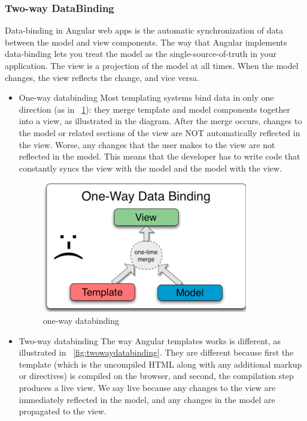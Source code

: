 \documentclass[14pt,a4paper]{extreport}
\begin{document}
			\subsubsection{Two-way DataBinding}
				Data-binding in Angular web apps is the automatic synchronization of data between the 
model and view components. The way that Angular implements data-binding lets you treat the model as the single-source-of-truth in your application. The view is a projection of the model at all times. When the model changes, the view reflects the change, and vice versa.
			\begin{itemize}
			\item One-way databinding
			Most templating systems bind data in only one direction (as in ~\ref{fig:onewaydatabinding}): they merge template and model components together into a view, as illustrated in the diagram. After the merge occurs, changes to the model or related sections of the view are NOT automatically reflected in the view. Worse, any changes that the user makes to the view are not reflected in the model. This means that the developer has to write code that constantly syncs the view with the model and the model with the view.
			\begin{figure}
				\begin{center}
					\includegraphics[scale=1]{onewaydatabinding.png}
					\caption{one-way databinding}
					\label{fig:onewaydatabinding}
				\end{center}
			\end{figure}
			\item Two-way databinding
			The way Angular templates works is different, as illustrated in ~\ref{fig:twowaydatabinding}. They are different because first the template (which is the uncompiled HTML along with any additional markup or directives) is compiled on the browser, and second, the compilation step produces a live view. We say live because any changes to the view are immediately reflected in the model, and any changes in the model are propagated to the view.

\end{itemize}
\end{document}
